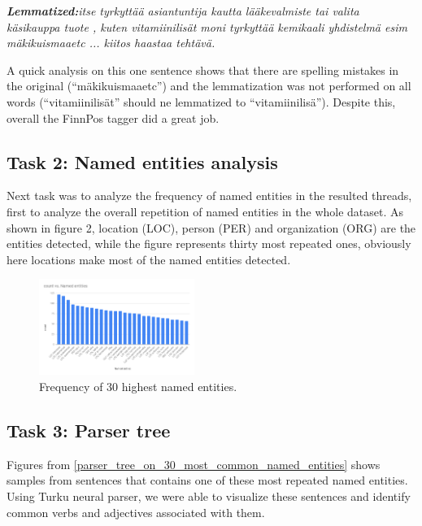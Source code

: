 \documentclass[conference]{IEEEtran}
\begin{document}
\textit{\textbf{Lemmatized:}itse tyrkyttää asiantuntija kautta lääkevalmiste tai valita käsikauppa tuote , kuten vitamiinilisät moni tyrkyttää kemikaali yhdistelmä esim mäkikuismaaetc ... kiitos haastaa tehtävä.}

A quick analysis on this one sentence shows that there are spelling mistakes in the original (“mäkikuismaaetc”) and the lemmatization was not performed on all words (“vitamiinilisät” should ne lemmatized to “vitamiinilisä”). Despite this, overall the FinnPos tagger did a great job.

\subsection{Task 2: Named entities analysis}
Next task was to analyze the frequency of named entities in the resulted threads, first to analyze the overall repetition of named entities in the whole dataset. As shown in figure 2, location (LOC), person (PER) and organization (ORG) are the entities detected, while the figure represents thirty most repeated ones, obviously here locations make most of the named entities detected.

\begin{figure}[htbp]
    \centerline{\includegraphics[width=0.45\textwidth]{figures/fig4.png}}
    \caption{Frequency of 30 highest named entities.}
    \label{frequency_of_30_highest_named_entities}
\end{figure}

\subsection{Task 3: Parser tree}
Figures from \ref{parser_tree_on_30_most_common_named_entities} shows samples from sentences that contains one of these most repeated named entities. Using Turku neural parser, we were able to visualize these sentences and identify common verbs and adjectives associated with them.
\end{document}
